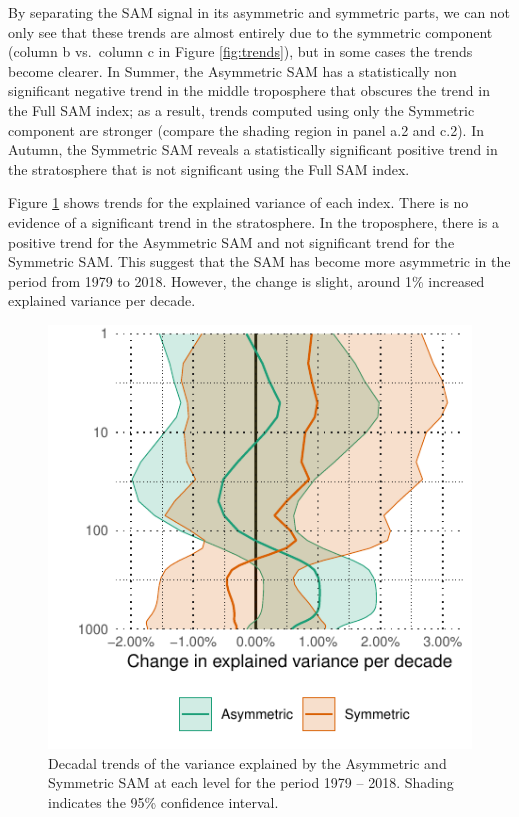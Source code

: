 \documentclass[smallextended]{svjour3}       %
\begin{document}
By separating the SAM signal in its asymmetric and symmetric parts, we can not only see that these trends are almost entirely due to the symmetric component (column b vs.~column c in Figure \ref{fig:trends}), but in some cases the trends become clearer. In Summer, the Asymmetric SAM has a statistically non significant negative trend in the middle troposphere that obscures the trend in the Full SAM index; as a result, trends computed using only the Symmetric component are stronger (compare the shading region in panel a.2 and c.2). In Autumn, the Symmetric SAM reveals a statistically significant positive trend in the stratosphere that is not significant using the Full SAM index.

Figure \ref{fig:r-squared-trend} shows trends for the explained variance of each index. There is no evidence of a significant trend in the stratosphere. In the troposphere, there is a positive trend for the Asymmetric SAM and not significant trend for the Symmetric SAM. This suggest that the SAM has become more asymmetric in the period from 1979 to 2018. However, the change is slight, around 1\% increased explained variance per decade.

\begin{figure}
\includegraphics{r-squared-trend-1} \caption{Decadal trends of the variance explained by the Asymmetric and Symmetric SAM at each level for the period 1979 -- 2018. Shading indicates the 95\% confidence interval.}\label{fig:r-squared-trend}
\end{figure}
\end{document}
